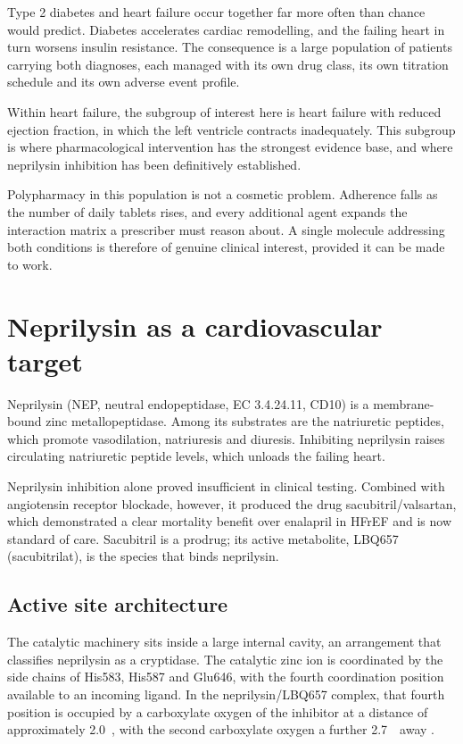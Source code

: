 \documentclass[11pt,a4paper]{article}
\newcommand{\ang}{\text{\AA}}
\begin{document}
Type 2 diabetes and heart failure occur together far more often than chance
would predict. Diabetes accelerates cardiac remodelling, and the failing heart
in turn worsens insulin resistance. The consequence is a large population of
patients carrying both diagnoses, each managed with its own drug class, its own
titration schedule and its own adverse event profile.

Within heart failure, the subgroup of interest here is heart failure with
reduced ejection fraction, in which the left ventricle contracts inadequately.
This subgroup is where pharmacological intervention has the strongest evidence
base, and where neprilysin inhibition has been definitively established.

Polypharmacy in this population is not a cosmetic problem. Adherence falls as
the number of daily tablets rises, and every additional agent expands the
interaction matrix a prescriber must reason about. A single molecule addressing
both conditions is therefore of genuine clinical interest, provided it can be
made to work.

\section{Neprilysin as a cardiovascular target}

Neprilysin (NEP, neutral endopeptidase, EC 3.4.24.11, CD10) is a
membrane-bound zinc metallopeptidase. Among its substrates are the natriuretic
peptides, which promote vasodilation, natriuresis and diuresis. Inhibiting
neprilysin raises circulating natriuretic peptide levels, which unloads the
failing heart.

Neprilysin inhibition alone proved insufficient in clinical testing. Combined
with angiotensin receptor blockade, however, it produced the drug
sacubitril/valsartan, which demonstrated a clear mortality benefit over
enalapril in HFrEF and is now standard of care. Sacubitril is a prodrug; its
active metabolite, LBQ657 (sacubitrilat), is the species that binds neprilysin.

\subsection{Active site architecture}

The catalytic machinery sits inside a large internal cavity, an arrangement
that classifies neprilysin as a cryptidase. The catalytic zinc ion is
coordinated by the side chains of His583, His587 and Glu646, with the fourth
coordination position available to an incoming ligand. In the
neprilysin/LBQ657 complex, that fourth position is occupied by a carboxylate
oxygen of the inhibitor at a distance of approximately 2.0~\ang, with the
second carboxylate oxygen a further 2.7~\ang\ away \cite{schiering2016}.
\end{document}
